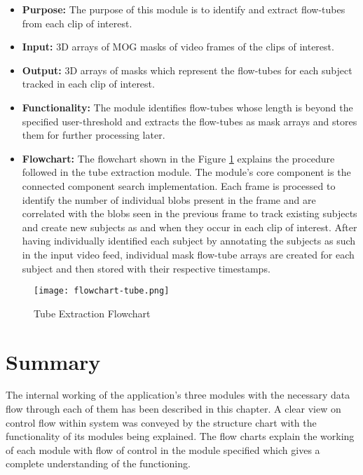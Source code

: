     \begin{itemize}
        \item \textbf{Purpose:} The purpose of this module is to identify and extract flow-tubes from each clip of interest.
        \item \textbf{Input:} 3D arrays of MOG masks of video frames of the clips of interest.
        \item \textbf{Output:} 3D arrays of masks which represent the flow-tubes for each subject tracked in each clip of interest.
        \item \textbf{Functionality:} The module identifies flow-tubes whose length is beyond the specified user-threshold and extracts the flow-tubes as mask arrays and stores them for further processing later.
        \item \textbf{Flowchart:} The flowchart shown in the Figure \ref{img:flowchart-tube} explains the procedure followed in the tube extraction module. The module’s core component is the connected component search implementation. Each frame is processed to identify the number of individual blobs present in the frame and are correlated with the blobs seen in the previous frame to track existing subjects and create new subjects as and when they occur in each clip of interest. After having individually identified each subject by annotating the subjects as such in the input video feed, individual mask flow-tube arrays are created for each subject and then stored with their respective timestamps.
    \end{itemize}

    \begin{figure}[H]
        \centering
        \texttt{[image: flowchart-tube.png]}
        \caption{Tube Extraction Flowchart}
        \label{img:flowchart-tube}
    \end{figure}

\section{Summary}
The internal working of the application’s three modules with the necessary data flow through each of them has been described in this chapter. A clear view on control flow within system was conveyed by the structure chart with the functionality of its modules being explained. The flow charts explain the working of each module with flow of control in the module specified which gives a complete understanding of the functioning.